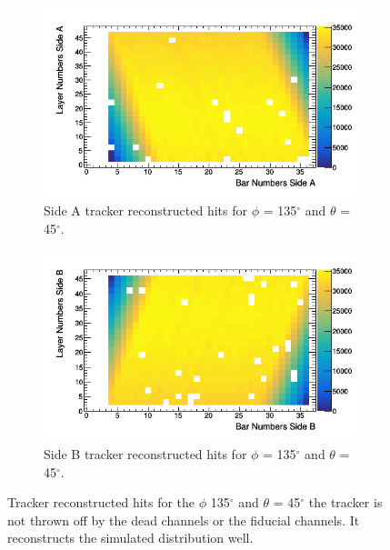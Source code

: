 \begin{figure}[!h]
\centering
\begin{subfigure}{.5\textwidth}
  \centering
  \includegraphics[width=\linewidth]{Chapter5/Figs/cosmicTrackerUncertainties/trackedAWithDead.png}
  \captionsetup{width=.9\linewidth}
  \caption{Side A tracker reconstructed hits for $\phi$ = 135$^\circ$ and $\theta$ = 45$^\circ$.}
  \label{subFig:trackedAWithDead}
\end{subfigure}%
\begin{subfigure}{.5\textwidth}
  \centering
\includegraphics[width=\linewidth]{Chapter5/Figs/cosmicTrackerUncertainties/trackedBWithDead.png}
  \captionsetup{width=.9\linewidth}
  \caption{Side B tracker reconstructed hits for $\phi$ = 135$^\circ$ and $\theta$ = 45$^\circ$.}
  \label{subFig:trackedBWithDead}
\end{subfigure}
\caption{Tracker reconstructed hits for the $\phi$ 135$^\circ$ and $\theta$ = 45$^\circ$ the tracker is not thrown off by the dead channels or the fiducial channels. It reconstructs the simulated distribution well.}
\label{fig:trackedABWithDead}
\end{figure}

